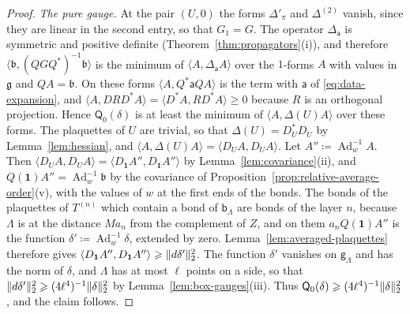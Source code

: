 \documentclass[11pt]{preprint}
\newcommand{\id}{\mathbf 1}
\newcommand{\Ad}{\operatorname{Ad}}
\DeclarePairedDelimiter{\norm}{\lVert}{\rVert}
\numberwithin{equation}{section}
\begin{document}
\begin{proof}
\emph{The pure gauge.} At the pair $(U, 0)$ the forms $\Delta'_\pi$ and $\Delta^{(2)}$ vanish, since they are linear in the second entry, so that $G_1 = G$. The operator $\Delta_{\mathsf a}$ is symmetric and positive definite (Theorem~\ref{thm:propagators}(i)), and therefore $\langle\mathfrak b, (QGQ^*)^{-1}\mathfrak b\rangle$ is the minimum of $\langle A, \Delta_{\mathsf a}A\rangle$ over the $1$-forms $A$ with values in $\mathfrak g$ and $QA = \mathfrak b$. On these forms $\langle A, Q^*\mathsf aQA\rangle$ is the term with $\mathsf a$ of \eqref{eq:data-expansion}, and $\langle A, DRD^*A\rangle = \langle D^*A, RD^*A\rangle \geqslant 0$ because $R$ is an orthogonal projection. Hence $\mathsf Q_0(\delta)$ is at least the minimum of $\langle A, \Delta(U)A\rangle$ over these forms. The plaquettes of $U$ are trivial, so that $\Delta(U) = D^*_UD_U$ by Lemma~\ref{lem:hessian}, and $\langle A, \Delta(U)A\rangle = \langle D_UA, D_UA\rangle$. Let $A'' \coloneqq \Ad_w^{-1}A$. Then $\langle D_UA, D_UA\rangle = \langle D_{\id}A'', D_{\id}A''\rangle$ by Lemma~\ref{lem:covariance}(ii), and $Q(\id)A'' = \Ad_w^{-1}\mathfrak b$ by the covariance of Proposition~\ref{prop:relative-average-order}(v), with the values of $w$ at the first ends of the bonds. The bonds of the plaquettes of $T^{(n)}$ which contain a bond of $\mathsf b_\Lambda$ are bonds of the layer $n$, because $\Lambda$ is at the distance $Ma_n$ from the complement of $Z$, and on them $a_nQ(\id)A''$ is the function $\delta' \coloneqq \Ad_w^{-1}\delta$, extended by zero. Lemma~\ref{lem:averaged-plaquettes} therefore gives $\langle D_{\id}A'', D_{\id}A''\rangle \geqslant \norm{d\delta'}_2^2$. The function $\delta'$ vanishes on $\mathsf g_\Lambda$ and has the norm of $\delta$, and $\Lambda$ has at most $\ell$ points on a side, so that $\norm{d\delta'}_2^2 \geqslant (4\ell^4)^{-1}\norm\delta_2^2$ by Lemma~\ref{lem:box-gauges}(iii). Thus $\mathsf Q_0(\delta) \geqslant (4\ell^4)^{-1}\norm\delta_2^2$, and the claim follows.
\end{proof}
\end{document}
